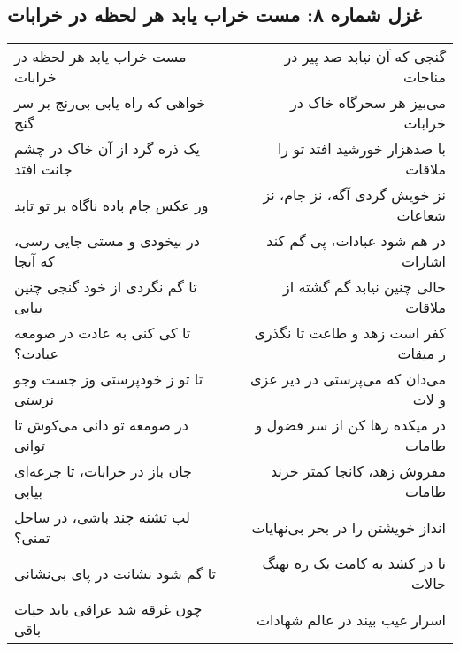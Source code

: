 \begin{center}
\section*{غزل شماره ۸: مست خراب یابد هر لحظه در خرابات}
\label{sec:008}
\begin{longtable}{l p{0.5cm} r}
مست خراب یابد هر لحظه در خرابات
&&
گنجی که آن نیابد صد پیر در مناجات
\\
خواهی که راه یابی بی‌رنج بر سر گنج
&&
می‌بیز هر سحرگاه خاک در خرابات
\\
یک ذره گرد از آن خاک در چشم جانت افتد
&&
با صدهزار خورشید افتد تو را ملاقات
\\
ور عکس جام باده ناگاه بر تو تابد
&&
نز خویش گردی آگه، نز جام، نز شعاعات
\\
در بیخودی و مستی جایی رسی، که آنجا
&&
در هم شود عبادات، پی گم کند اشارات
\\
تا گم نگردی از خود گنجی چنین نیابی
&&
حالی چنین نیابد گم گشته از ملاقات
\\
تا کی کنی به عادت در صومعه عبادت؟
&&
کفر است زهد و طاعت تا نگذری ز میقات
\\
تا تو ز خودپرستی وز جست وجو نرستی
&&
می‌دان که می‌پرستی در دیر عزی و لات
\\
در صومعه تو دانی می‌کوش تا توانی
&&
در میکده رها کن از سر فضول و طامات
\\
جان باز در خرابات، تا جرعه‌ای بیابی
&&
مفروش زهد، کانجا کمتر خرند طامات
\\
لب تشنه چند باشی، در ساحل تمنی؟
&&
انداز خویشتن را در بحر بی‌نهایات
\\
تا گم شود نشانت در پای بی‌نشانی
&&
تا در کشد به کامت یک ره نهنگ حالات
\\
چون غرقه شد عراقی یابد حیات باقی
&&
اسرار غیب بیند در عالم شهادات
\\
\end{longtable}
\end{center}
